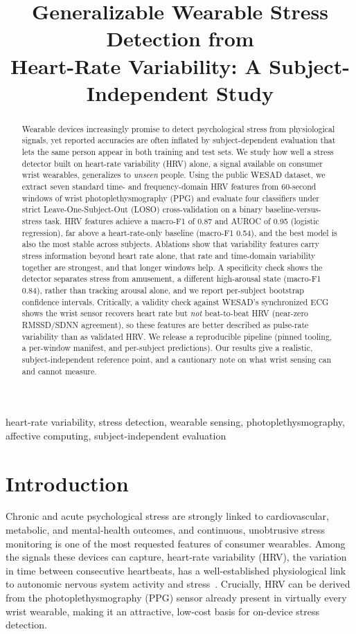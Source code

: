 \documentclass[conference]{IEEEtran}
\title{Generalizable Wearable Stress Detection from\\ Heart-Rate Variability: A Subject-Independent Study}
\author{\IEEEauthorblockN{Aravind Marri}
\IEEEauthorblockA{\textit{Independent Researcher}\\
contact@aravindmarri.com}}
\begin{document}
\maketitle

\begin{abstract}
Wearable devices increasingly promise to detect psychological stress from
physiological signals, yet reported accuracies are often inflated by
subject-dependent evaluation that lets the same person appear in both training
and test sets. We study how well a stress detector built on heart-rate
variability (HRV) alone, a signal available on consumer wrist wearables,
generalizes to \emph{unseen} people. Using the public WESAD dataset, we extract
seven standard time- and frequency-domain HRV features from 60-second windows of
wrist photoplethysmography (PPG) and evaluate four classifiers under strict
Leave-One-Subject-Out (LOSO) cross-validation on a binary baseline-versus-stress
task. HRV features achieve a macro-F1 of 0.87 and AUROC of 0.95 (logistic
regression), far above a heart-rate-only baseline (macro-F1 0.54), and the best
model is also the most stable across subjects. Ablations show that variability
features carry stress information beyond heart rate alone, that rate and time-domain
variability together are strongest, and that longer windows help. A specificity check
shows the detector separates stress from amusement, a different high-arousal state
(macro-F1 0.84), rather than tracking arousal alone, and we report per-subject bootstrap
confidence intervals. Critically, a
validity check against WESAD's synchronized ECG shows the wrist sensor recovers heart
rate but \emph{not} beat-to-beat HRV (near-zero RMSSD/SDNN agreement), so these
features are better described as pulse-rate variability than as validated HRV. We
release a reproducible pipeline (pinned tooling, a per-window manifest, and
per-subject predictions). Our results give a realistic, subject-independent reference
point, and a cautionary note on what wrist sensing can and cannot measure.
\end{abstract}

\begin{IEEEkeywords}
heart-rate variability, stress detection, wearable sensing, photoplethysmography,
affective computing, subject-independent evaluation
\end{IEEEkeywords}

\section{Introduction}
\label{sec:intro}
Chronic and acute psychological stress are strongly linked to cardiovascular,
metabolic, and mental-health outcomes, and continuous, unobtrusive stress
monitoring is one of the most requested features of consumer wearables. Among the
signals these devices can capture, heart-rate variability (HRV), the variation in
time between consecutive heartbeats, has a well-established physiological link to
autonomic nervous system activity and stress~\cite{taskforce1996hrv,shaffer2017hrv,kim2018hrv}.
Crucially, HRV can be derived from the photoplethysmography (PPG) sensor already
present in virtually every wrist wearable, making it an attractive, low-cost basis
for on-device stress detection.
\end{document}
